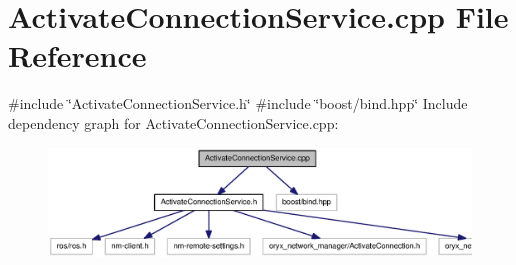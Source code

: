\section{\-Activate\-Connection\-Service.\-cpp \-File \-Reference}
\label{ActivateConnectionService_8cpp}
{\ttfamily \#include \char`\"{}\-Activate\-Connection\-Service.\-h\char`\"{}}\*
{\ttfamily \#include \char`\"{}boost/bind.\-hpp\char`\"{}}\*
\-Include dependency graph for \-Activate\-Connection\-Service.\-cpp\-:
\nopagebreak
\begin{figure}[H]
\begin{center}
\leavevmode
\includegraphics[width=350pt]{ActivateConnectionService_8cpp__incl}
\end{center}
\end{figure}
